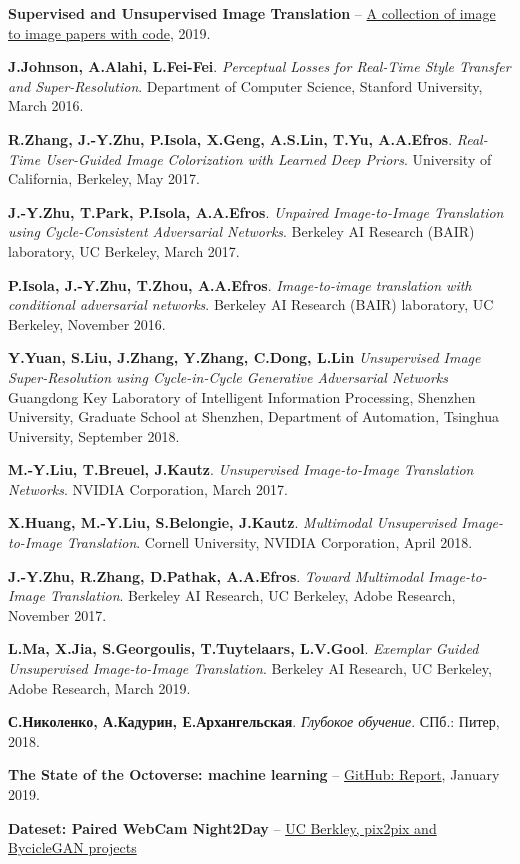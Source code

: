 \documentclass[11pt,a4paper]{extarticle}
\begin{document}
\begin{thebibliography}{00}

	
	\textbf{Supervised and Unsupervised Image Translation} --
	\href{https://github.com/lzhbrian/image-to-image-papers}{A collection of image to image papers with code},
	2019.

	\textbf{J.Johnson, A.Alahi, L.Fei-Fei}.
	\emph{Perceptual Losses for Real-Time Style Transfer and Super-Resolution}.
	Department of Computer Science, Stanford University,
	March 2016.

	\textbf{R.Zhang, J.-Y.Zhu, P.Isola, X.Geng, A.S.Lin, T.Yu, A.A.Efros}.
	\emph{Real-Time User-Guided Image Colorization with Learned Deep Priors}.
	University of California, Berkeley,
	May 2017.

	\textbf{J.-Y.Zhu, T.Park, P.Isola, A.A.Efros}.
	\emph{Unpaired Image-to-Image Translation using Cycle-Consistent Adversarial Networks}.
	Berkeley AI Research (BAIR) laboratory, UC Berkeley,
	March 2017.

	\textbf{P.Isola, J.-Y.Zhu, T.Zhou, A.A.Efros}.
	\emph{Image-to-image translation with conditional adversarial networks}.
	Berkeley AI Research (BAIR) laboratory, UC Berkeley,
	November 2016.

	\textbf{Y.Yuan, S.Liu, J.Zhang, Y.Zhang, C.Dong, L.Lin}
	\emph{Unsupervised Image Super-Resolution using Cycle-in-Cycle Generative Adversarial Networks}
	Guangdong Key Laboratory of Intelligent Information Processing, Shenzhen University,
	Graduate School at Shenzhen, Department of Automation, Tsinghua University,
	September 2018.

	\textbf{M.-Y.Liu, T.Breuel, J.Kautz}.
	\emph{Unsupervised Image-to-Image Translation Networks}.
	NVIDIA Corporation,
	March 2017.
	
	\textbf{X.Huang, M.-Y.Liu, S.Belongie, J.Kautz}.
	\emph{Multimodal Unsupervised Image-to-Image Translation}.
	Cornell University, NVIDIA Corporation,
	April 2018.

	\textbf{J.-Y.Zhu, R.Zhang, D.Pathak, A.A.Efros}.
	\emph{Toward Multimodal Image-to-Image Translation}.
	Berkeley AI Research, UC Berkeley, Adobe Research,
	November 2017.

	\textbf{L.Ma, X.Jia, S.Georgoulis, T.Tuytelaars, L.V.Gool}.
	\emph{Exemplar Guided Unsupervised Image-to-Image Translation}.
	Berkeley AI Research, UC Berkeley, Adobe Research,
	March 2019.
	
	\textbf{С.Николенко, А.Кадурин, Е.Архангельская}.
	\emph{Глубокое обучение}.
	СПб.: Питер, 
	2018.

	\textbf{The State of the Octoverse: machine learning} --
	\href{https://github.blog/2019-01-24-the-state-of-the-octoverse-machine-learning/}{GitHub: Report},
	January 2019.

	\textbf{Dateset: Paired WebCam Night2Day} -- 
	\href{http://efrosgans.eecs.berkeley.edu/pix2pix/datasets/}{UC Berkley, pix2pix and BycicleGAN projects}

\end{thebibliography}
\end{document}
